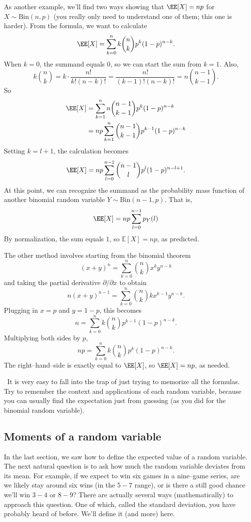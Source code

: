 \documentclass{ximera}
\begin{document}
As another example, we'll find two ways showing that $\EE[X]=np$ for $X \sim \text{Bin}(n,p)$ (you really only need to understand one of them; this one is harder). From the formula, we want to calculate
$$
\EE[X] = \sum_{k=0}^n k \binom{n}{k} p^k (1-p)^{n-k}.
$$
When $k=0$, the summand equals $0$, so we can start the sum from $k=1$. Also,
$$
k \binom{n}{k} = k \cdot \frac{n!}{k!(n-k)!} = \frac{n!}{(k-1)! (n-k)!} = n \binom{n-1}{k-1}.
$$
So 
\begin{align*}
\EE[X] &= \sum_{k=1}^n n \binom{n-1}{k-1}p^k (1-p)^{n-k}\\
&= np \sum_{k=1}^n  \binom{n-1}{k-1}p^{k-1} (1-p)^{n-k}
\end{align*}
Setting $k=l+1$, the calculation becomes
$$
\EE[X] = np \sum_{l=0}^{n-1}  \binom{n-1}{l}p^{l} (1-p)^{n-l+1}.
$$
At this point, we can recognize the summand as the probability mass function of another binomial random variable $Y \sim \text{Bin}(n-1,p)$. That is,
$$
\EE[X] = np \sum_{l=0}^{n-1} p_Y(l)
$$
By normalization, the sum equals $1$, so $\mathbb{E}[X]=np$, as predicted.

The other method involves starting from the binomial theorem
$$
(x+y)^n = \sum_{k=0}^n \binom{n}{k} x^k y^{n-k}
$$
and taking the partial derivative $\partial / \partial x$ to obtain
$$
n(x+y)^{n-1} = \sum_{k=0}^n \binom{n}{k} k x^{k-1} y^{n-k}.
$$
Plugging in $x=p$ and $y=1-p$, this becomes
$$
n =\sum_{k=0}^n k \binom{n}{k}  p^{k-1} (1-p)^{n-k}.
$$
Multiplying both sides by $p$, 
$$
np =  \sum_{k=0}^n k \binom{n}{k}  p^{k} (1-p)^{n-k}.
$$
The right--hand--side is exactly equal to $\EE[X]$, so $\EE[X]=np$, as needed.

\Lightning \Lightning\  It is very easy to fall into the trap of just trying to memorize all the formulas. Try to remember the context and applications of each random variable, because you can usually find the expectation just from guessing (as you did for the binomial random variable). \Lightning \Lightning

\subsection{Moments of a random variable}
In the last section, we saw how to define the expected value of a random variable. The next natural question is to ask how much the random variable deviates from its mean. For example, if we expect to win six games in a nine--game series, are we likely stay around six wins (in the $5-7$ range), or is there a still good chance we'll win $3-4$ or $8-9$? There are actually several ways (mathematically) to approach this question. One of which, called the standard deviation, you have probably heard of before. We'll define it (and more) here.
\end{document}

